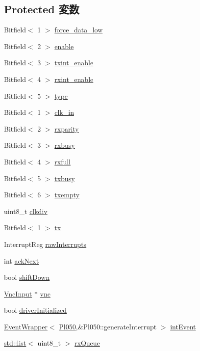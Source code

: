 \subsection*{Protected 変数}
\begin{DoxyCompactItemize}
\item 
Bitfield$<$ 1 $>$ \hyperlink{classPl050_ac85a33c0241e926e1e133ec81ea09e1b}{force\_\-data\_\-low}
\item 
Bitfield$<$ 2 $>$ \hyperlink{classPl050_a10e20e217e3d67e2d20eed7ba60b5abf}{enable}
\item 
Bitfield$<$ 3 $>$ \hyperlink{classPl050_a8be90b7eaebfdf66f8f76df2c35749f1}{txint\_\-enable}
\item 
Bitfield$<$ 4 $>$ \hyperlink{classPl050_ac524c29efd86a04fe395e469bf48963b}{rxint\_\-enable}
\item 
Bitfield$<$ 5 $>$ \hyperlink{classPl050_ae880673634fb4c5ac4c5854a2490401a}{type}
\item 
Bitfield$<$ 1 $>$ \hyperlink{classPl050_ac86e910c41bcd2b2b02875f862bc4204}{clk\_\-in}
\item 
Bitfield$<$ 2 $>$ \hyperlink{classPl050_a1e505c28dece6bcfc640c89e379073d5}{rxparity}
\item 
Bitfield$<$ 3 $>$ \hyperlink{classPl050_abefe6ab60abda20d7264b5b22bb4048c}{rxbusy}
\item 
Bitfield$<$ 4 $>$ \hyperlink{classPl050_a0ec902d94a3ae210a8266e9ea5e0ff75}{rxfull}
\item 
Bitfield$<$ 5 $>$ \hyperlink{classPl050_a1d29e46d92d912324287f82c29e23f24}{txbusy}
\item 
Bitfield$<$ 6 $>$ \hyperlink{classPl050_af389e6d9640f1d43721d64e35c51b99a}{txempty}
\item 
uint8\_\-t \hyperlink{classPl050_abeb566ea63abc9ab6a987f0a6b99d0de}{clkdiv}
\item 
Bitfield$<$ 1 $>$ \hyperlink{classPl050_a429f49b4fd10858ef7c2557020a03d25}{tx}
\item 
InterruptReg \hyperlink{classPl050_ad4097b6a619d6dc0448b637554b87158}{rawInterrupts}
\item 
int \hyperlink{classPl050_ad11eded38a493c41b578c9ca28f528f8}{ackNext}
\item 
bool \hyperlink{classPl050_a0a89e7496669527845e89de84902ff53}{shiftDown}
\item 
\hyperlink{classVncInput}{VncInput} $\ast$ \hyperlink{classPl050_a52d1b5d3426a30e18a452cd67d87ec13}{vnc}
\item 
bool \hyperlink{classPl050_aed3536f6eab29208a570ebb75f43a9ce}{driverInitialized}
\item 
\hyperlink{classEventWrapper}{EventWrapper}$<$ \hyperlink{classPl050}{Pl050},\&Pl050::generateInterrupt $>$ \hyperlink{classPl050_af9021b7232a0425b2cc0f8c778ef44dc}{intEvent}
\item 
\hyperlink{classstd_1_1list}{std::list}$<$ uint8\_\-t $>$ \hyperlink{classPl050_a8eaa5d81b6a16387d60ab6bcd893700e}{rxQueue}
\end{DoxyCompactItemize}
